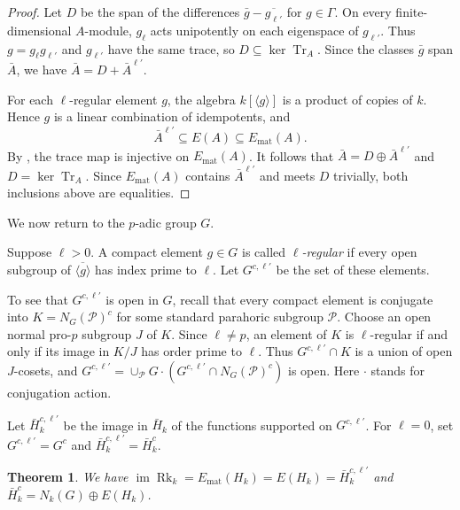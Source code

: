 \documentclass[11pt,letterpaper]{amsart}
\newtheorem{theorem}{Theorem}
\theoremstyle{definition}
\numberwithin{equation}{section}
\numberwithin{theorem}{section}
\newcommand{\kk}{k}
\DeclareMathOperator{\Tr}{Tr}
\DeclareMathOperator{\Rk}{Rk}
\DeclareMathOperator{\im}{im}
\begin{document}
\begin{proof}
Let $D$ be the span of the differences
$\bar g-\overline{g_{\ell'}}$ for $g\in\Gamma$.
On every finite-dimensional $A$-module, $g_\ell$ acts
unipotently on each eigenspace of $g_{\ell'}$.
Thus $g=g_\ell g_{\ell'}$ and $g_{\ell'}$ have the same
trace, so $D\subseteq\ker\Tr_A$.
Since the classes $\bar g$ span $\bar A$, we have
$\bar A=D+\bar A^{\ell'}$.

For each $\ell$-regular element $g$, the algebra
$\kk[\langle g\rangle]$ is a product of copies of $\kk$.
Hence $g$ is a linear combination of idempotents, and
\[
 \bar A^{\ell'}\subseteq E(A)\subseteq E_{\mathrm{mat}}(A).
\]
By , the trace map is injective
on $E_{\mathrm{mat}}(A)$. It follows that
$\bar A=D\oplus\bar A^{\ell'}$ and $D=\ker\Tr_A$.
Since $E_{\mathrm{mat}}(A)$ contains $\bar A^{\ell'}$ and
meets $D$ trivially, both inclusions above are equalities.
\end{proof}

We now return to the $p$-adic group $G$. 

Suppose $\ell>0$. A compact element $g\in G$ is called
\emph{$\ell$-regular} if every open subgroup of
$\overline{\langle g\rangle}$ has index prime to $\ell$.
Let $G^{c,\ell'}$ be the set of these elements. 

To see that $G^{c, \ell'}$ is open in $G$, recall that every compact element is conjugate into $K=N_G(\mathcal P)^c$ for some standard parahoric subgroup $\mathcal P$.
Choose an open normal pro-$p$ subgroup $J$ of $K$.
Since $\ell\ne p$, an element of $K$ is $\ell$-regular
if and only if its image in $K/J$ has order prime to $\ell$.
Thus $G^{c,\ell'}\cap K$ is a union of open $J$-cosets,
and $G^{c,\ell'}=\cup_{\mathcal P} G \cdot (G^{c,\ell'}\cap N_G(\mathcal P)^c)$ is open. Here $\cdot$ stands for conjugation action.

Let $\bar H_\kk^{c,\ell'}$ be the image in $\bar H_\kk$
of the functions supported on $G^{c,\ell'}$.
For $\ell=0$, set $G^{c,\ell'}=G^c$ and
$\bar H_\kk^{c,\ell'}=\bar H_\kk^c$.

\begin{theorem}
\label{thm:rank-regular}
We have $\im\Rk_\kk=E_{\mathrm{mat}}(H_\kk)=E(H_\kk)=\bar H_\kk^{c,\ell'}$
and $\bar H_\kk^c=N_\kk(G)\oplus E(H_\kk)$.
\end{theorem}
\end{document}
